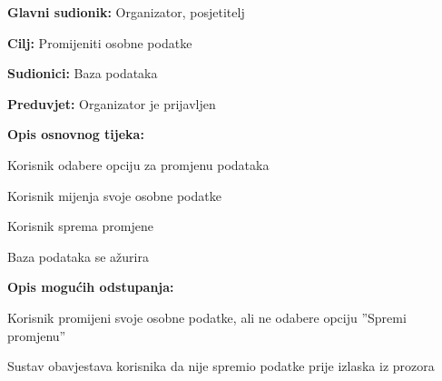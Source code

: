 					\noindent {}
					\begin{packed_item}

						\item \textbf{Glavni sudionik:} Organizator, posjetitelj
						\item  \textbf{Cilj:} Promijeniti osobne podatke
						\item  \textbf{Sudionici:} Baza podataka
						\item  \textbf{Preduvjet:} Organizator je prijavljen
						\item  \textbf{Opis osnovnog tijeka:}

						\item[] \begin{packed_enum}

							\item Korisnik odabere opciju za promjenu podataka
							\item Korisnik mijenja svoje osobne podatke
							\item Korisnik sprema promjene
							\item Baza podataka se ažurira

						\end{packed_enum}

						\item  \textbf{Opis mogućih odstupanja:}

						\item[] \begin{packed_item}

							\item[2.a] Korisnik promijeni svoje osobne podatke, ali ne odabere opciju ”Spremi
							promjenu”
							\item[] \begin{packed_enum}

								\item Sustav obavjestava korisnika da nije spremio podatke prije izlaska iz prozora

							\end{packed_enum}

						\end{packed_item}

					\end{packed_item}

